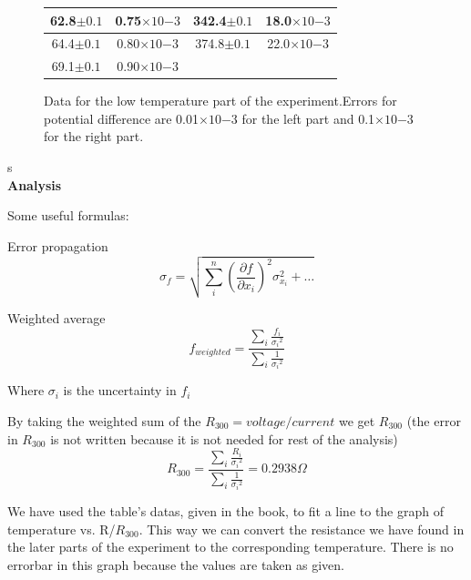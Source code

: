 \documentclass[10pt,a4paper]{article}
\begin{document}
{\begin{center}
\begin{figure} [H]
\begin{tabular}{|c |c||c|c|}
			62.8$\pm0.1$ &0.75$\times10{-3}$ & 342.4$\pm0.1$  & 18.0$\times10{-3}$\\
			\hline
			64.4$\pm0.1$ &0.80$\times10{-3}$ & 374.8$\pm0.1$ &  22.0$\times10{-3}$\\
			\hline
			69.1$\pm0.1$ &0.90$\times10{-3}$ &        &             \\
			\hline
		\end{tabular}
		\caption{Data for the low temperature part of the experiment.Errors for potential difference are 0.01$\times10{-3}$ for the left part and 0.1$\times10{-3}$ for the right part.}
	\end{figure}
\end{center}
s
\\[\baselineskip]
\textbf{Analysis}\\[\baselineskip]
\par Some useful formulas:
\par Error propagation
\begin{equation}
{\sigma }_{f}=\sqrt{\sum _{i}^{n}{\left(\frac{\partial f}{\partial {x}_{i}}\right)}^{2}{\sigma }_{{x}_{i}}^{2}+\dots }
\end{equation}
\par Weighted average
\begin{equation}
f_{weighted}=\frac{\sum _{i}\frac{{f}_{i}}{{\sigma_i }^{2}}}{\sum _{i}\frac{1}{{\sigma_i }^{2}}}
\end{equation}
\par Where $\sigma_i$ is the uncertainty in $f_i$
\par By taking the weighted sum of the $R_{300}=voltage/current$ we get $R_{300}$ (the error in $R_{300}$ is not written because it is not needed for rest of the analysis)
\begin{equation}
R_{300}=\frac{\sum _{i}\frac{{R}_{i}}{{\sigma_i }^{2}}}{\sum _{i}\frac{1}{{\sigma_i }^{2}}}=0.2938\Omega
\end{equation}
\par We have used the table's datas, given in the book, to fit a line to the graph of temperature vs. R/$R_{300}$. This way we can convert the resistance we have found in the later parts of the experiment to the corresponding temperature. There is no errorbar in this graph because the values are taken as given. 
\begin{figure}[H]
\advance{}

\end{figure}}
\end{document}
